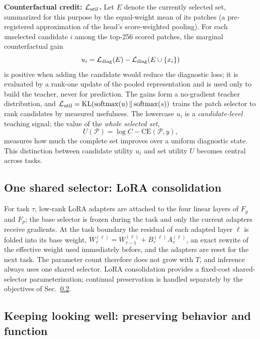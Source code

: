 \documentclass{article}
\def\L{{\cal L}}
\newcommand{\Fg}{F_g}
\newcommand{\Fp}{F_p}
\newcommand{\Psel}{\mathcal{P}}
\begin{document}
\textbf{Counterfactual credit: $\L_{\mathrm{util}}$.}
Let $E$ denote the currently selected set, summarized for this purpose by the equal-weight mean of its patches (a pre-registered approximation of the head's score-weighted pooling). For each unselected candidate $i$ among the top-256 scored patches, the marginal counterfactual gain
\begin{equation}
u_i
=
\L_{\mathrm{diag}}(E)
-
\L_{\mathrm{diag}}(E\cup\{x_i\})
\label{eq:ui}
\end{equation}
is positive when adding the candidate would reduce the diagnostic loss; it is evaluated by a rank-one update of the pooled representation and is used only to build the teacher, never for prediction. The gains form a no-gradient teacher distribution, and $\L_{\mathrm{util}}=\mathrm{KL}(\mathrm{softmax}(u)\,\Vert\,\mathrm{softmax}(s))$ trains the patch selector to rank candidates by measured usefulness. The lowercase $u_i$ is a \emph{candidate-level} teaching signal; the value of the \emph{whole selected set},
\begin{equation}
U(\Psel)
=
\log C-\mathrm{CE}(\Psel,y),
\label{eq:bigU}
\end{equation}
measures how much the complete set improves over a uniform diagnostic state. This distinction between candidate utility $u_i$ and set utility $U$ becomes central across tasks.

\subsection{One shared selector: LoRA consolidation}
\label{ssec:lora}

For task $\tau$, low-rank LoRA adapters are attached to the four linear layers of $\Fg$ and $\Fp$; the base selector is frozen during the task and only the current adapters receive gradients. At the task boundary the residual of each adapted layer $\ell$ is folded into its base weight, $W^{(\ell)}_{\tau}=W^{(\ell)}_{\tau-1}+B^{(\ell)}_\tau A^{(\ell)}_\tau$, an exact rewrite of the effective weight used immediately before, and the adapters are reset for the next task. The parameter count therefore does not grow with $T$, and inference always uses one shared selector. LoRA consolidation provides a fixed-cost shared-selector parameterization; continual preservation is handled separately by the objectives of Sec.~\ref{ssec:cl}.

\subsection{Keeping looking well: preserving behavior and function}
\label{ssec:cl}
\end{document}
